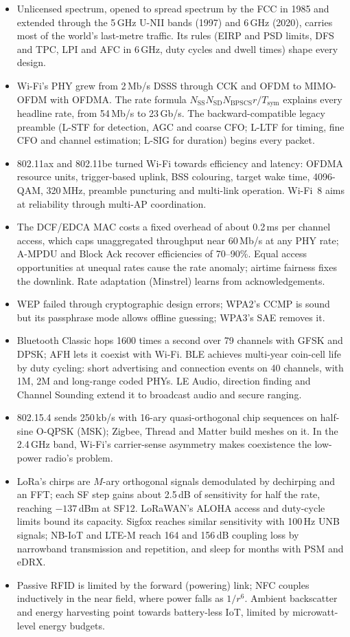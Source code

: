 \begin{itemize}
\item Unlicensed spectrum, opened to spread spectrum by the FCC in 1985 and extended through the
5\,GHz U-NII bands (1997) and 6\,GHz (2020), carries most of the world's last-metre traffic. Its rules
(EIRP and PSD limits, DFS and TPC, LPI and AFC in 6\,GHz, duty cycles and dwell times) shape every
design.
\item Wi-Fi's PHY grew from 2\,Mb/s DSSS through CCK and OFDM to MIMO-OFDM with OFDMA. The rate formula
$N_{\text{SS}}N_{\text{SD}}N_{\text{BPSCS}}r/T_{\text{sym}}$ explains every headline rate, from
54\,Mb/s to 23\,Gb/s. The backward-compatible legacy preamble (L-STF for detection, AGC and coarse CFO;
L-LTF for timing, fine CFO and channel estimation; L-SIG for duration) begins every packet.
\item 802.11ax and 802.11be turned Wi-Fi towards efficiency and latency: OFDMA resource units,
trigger-based uplink, BSS colouring, target wake time, 4096-QAM, 320\,MHz, preamble puncturing and
multi-link operation. Wi-Fi~8 aims at reliability through multi-AP coordination.
\item The DCF/EDCA MAC costs a fixed overhead of about 0.2\,ms per channel access, which caps
unaggregated throughput near 60\,Mb/s at any PHY rate; A-MPDU and Block Ack recover efficiencies of
70--90\%. Equal access opportunities at unequal rates cause the rate anomaly; airtime fairness fixes
the downlink. Rate adaptation (Minstrel) learns from acknowledgements.
\item WEP failed through cryptographic design errors; WPA2's CCMP is sound but its passphrase mode
allows offline guessing; WPA3's SAE removes it.
\item Bluetooth Classic hops 1600 times a second over 79 channels with GFSK and DPSK; AFH lets it
coexist with Wi-Fi. BLE achieves multi-year coin-cell life by duty cycling: short advertising and
connection events on 40 channels, with 1M, 2M and long-range coded PHYs. LE Audio, direction finding
and Channel Sounding extend it to broadcast audio and secure ranging.
\item 802.15.4 sends 250\,kb/s with 16-ary quasi-orthogonal chip sequences on half-sine O-QPSK (MSK);
Zigbee, Thread and Matter build meshes on it. In the 2.4\,GHz band, Wi-Fi's carrier-sense asymmetry
makes coexistence the low-power radio's problem.
\item LoRa's chirps are $M$-ary orthogonal signals demodulated by dechirping and an FFT; each SF step
gains about 2.5\,dB of sensitivity for half the rate, reaching $-137$\,dBm at SF12. LoRaWAN's ALOHA
access and duty-cycle limits bound its capacity. Sigfox reaches similar sensitivity with 100\,Hz UNB
signals; NB-IoT and LTE-M reach 164 and 156\,dB coupling loss by narrowband transmission and
repetition, and sleep for months with PSM and eDRX.
\item Passive RFID is limited by the forward (powering) link; NFC couples inductively in the near
field, where power falls as $1/r^6$. Ambient backscatter and energy harvesting point towards
battery-less IoT, limited by microwatt-level energy budgets.
\end{itemize}

